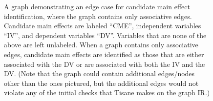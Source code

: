 {\begin{figure}[H]
\begin{tikzpicture}
        \end{tikzpicture}
        \caption{A graph demonstrating an edge case for candidate main effect identification, where the graph contains only associative edges. Candidate main effects are labeled ``CME'', independent variables ``IV'', and dependent variables ``DV''. Variables that are none of the above are left unlabeled. When a graph contains only associative edges, candidate main effects are identified as those that are either associated with the DV or are associated with both the IV and the DV. (Note that the graph could contain additional edges/nodes other than the ones pictured, but the additional edges would not violate any of the initial checks that Tisane makes on the graph IR.)}
        \label{fig:figureOnlyAssociatesOrCausesEdgesCandidateMainEffects}
    \end{figure}
}


